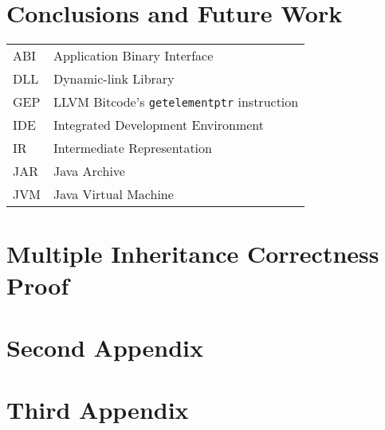 \documentclass[inscr,ack,preface]{diphdthesis}
\newcommand{\code}[1]{\texttt{#1}}
\begin{document}
\chapter{Conclusions and Future Work}




\backmatter


\abbreviations
\begin{center}
	\renewcommand{\arraystretch}{1.5}
	\begin{longtable}{ l @{\qquad} l }
      \toprule
      ABI    & Application Binary Interface \\
      DLL    & Dynamic-link Library \\
      GEP    & LLVM Bitcode's \code{getelementptr} instruction \\
      IDE    & Integrated Development Environment \\
      IR     & Intermediate Representation \\
      JAR    & Java Archive \\
      JVM    & Java Virtual Machine \\
      \bottomrule
	\end{longtable}
\end{center}



\begin{appendix}
\appendixstartedtrue

{}

\chapter{Multiple Inheritance Correctness Proof}


\chapter{Second Appendix}
\chapter{Third Appendix}
\end{appendix}



\printbibliography[title={References}]
\end{document}
